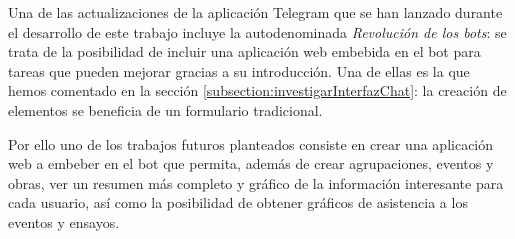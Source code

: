 Una de las actualizaciones de la aplicación Telegram que se han lanzado durante el desarrollo de este trabajo incluye la autodenominada \textit{Revolución de los bots}\cite{telegramWebappUpdate}: se trata de la posibilidad de incluir una aplicación web embebida en el bot para tareas que pueden mejorar gracias a su introducción. Una de ellas es la que hemos comentado en la sección \ref{subsection:investigarInterfazChat}: la creación de elementos se beneficia de un formulario tradicional. 

Por ello uno de los trabajos futuros planteados consiste en crear una aplicación web a embeber en el bot que permita, además de crear agrupaciones, eventos y obras, ver un resumen más completo y gráfico de la información interesante para cada usuario, así como la posibilidad de obtener gráficos de asistencia a los eventos y ensayos.
